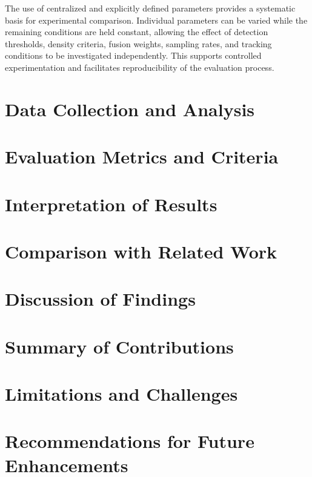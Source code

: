 \documentclass[12pt,a4paper]{report}
\begin{document}
The use of centralized and explicitly defined parameters provides a
systematic basis for experimental comparison. Individual parameters can be
varied while the remaining conditions are held constant, allowing the
effect of detection thresholds, density criteria, fusion weights, sampling
rates, and tracking conditions to be investigated independently. This
supports controlled experimentation and facilitates reproducibility of the
evaluation process.


\section{Data Collection and Analysis}
\section{Evaluation Metrics and Criteria}
\section{Interpretation of Results}
\section{Comparison with Related Work}
\section{Discussion of Findings}

\section{Summary of Contributions}
\section{Limitations and Challenges}
\section{Recommendations for Future Enhancements}


\newpage
\renewcommand{\bibname}{References}


\end{document}
